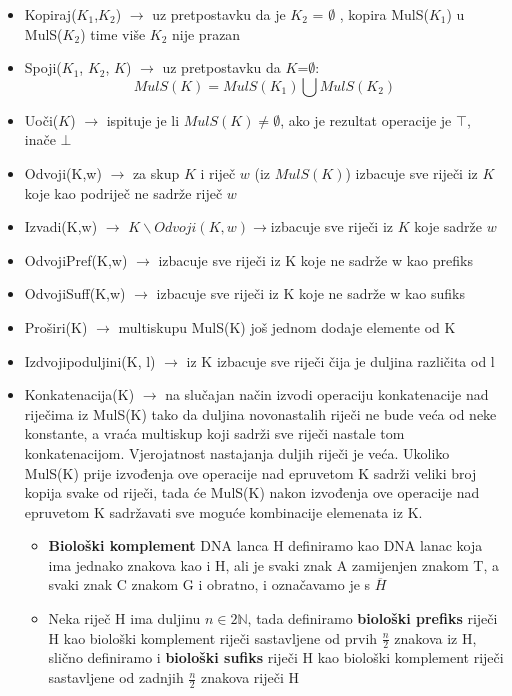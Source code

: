 \documentclass[a4paper,oneside,12pt]{memoir} %
\begin{document}
\begin{spacing}{1.5}
\begin{defn}
    \begin{itemize}
        \item Kopiraj($K_1$,$K_2$) $\to$ uz pretpostavku da je $K_2$ = $\emptyset$ , kopira MulS($K_1$) u MulS($K_2$) time više $K_2$ nije prazan
        \item Spoji($K_1$, $K_2$, $K$) $\to$ uz pretpostavku da $K$=$\emptyset$: \[MulS(K)=MulS(K_1)\bigcup MulS(K_2) \]
        \item Uoči($K$) $\to$ ispituje je li $MulS(K)\neq\emptyset$, ako je rezultat operacije je $\top$, inače $\bot$
        \item Odvoji(K,w) $\to$ za skup $K$ i riječ $w$ (iz $MulS(K)$) izbacuje sve riječi iz $K$ koje kao podriječ ne sadrže riječ $w$
        \item Izvadi(K,w) $\to$ $K\backslash Odvoji(K,w)\to $izbacuje sve riječi iz $K$ koje sadrže $w$
        \item Odvoji\textunderscore Pref(K,w) $\to$ izbacuje sve riječi iz K koje ne sadrže w kao prefiks
        \item Odvoji\textunderscore Suff(K,w) $\to$ izbacuje sve riječi iz K koje ne sadrže w kao sufiks
        \item Proširi(K) $\to$ multiskupu MulS(K) još jednom dodaje elemente od K
        \item Izdvoji\textunderscore po\textunderscore duljini(K, l) $\to$ iz K izbacuje sve riječi čija je duljina različita od l
        \item Konkatenacija(K) $\to$ na slučajan način izvodi operaciju konkatenacije nad riječima iz MulS(K) tako da duljina novonastalih riječi ne bude veća od neke konstante, a vraća multiskup koji sadrži sve riječi nastale tom konkatenacijom. Vjerojatnost nastajanja duljih riječi je veća. Ukoliko MulS(K) prije izvođenja ove operacije nad epruvetom K sadrži veliki broj kopija svake od riječi, tada će MulS(K) nakon izvođenja ove operacije nad epruvetom K sadržavati sve moguće kombinacije elemenata iz K.
            \begin{itemize}
                \item \textbf{Biološki komplement} DNA lanca H definiramo kao DNA lanac koja ima jednako znakova kao i H, ali je svaki znak A zamijenjen znakom T, a svaki znak C znakom G i obratno, i označavamo je s $\overline{H}$
                \item Neka riječ H ima duljinu $n \in 2\mathbb{N}$, tada definiramo \textbf{biološki prefiks} riječi H kao biološki komplement riječi sastavljene od prvih $\frac{n}{2}$ znakova iz H, slično definiramo i \textbf{biološki sufiks} riječi H kao biološki komplement riječi sastavljene od zadnjih $\frac{n}{2}$ znakova riječi H

\end{itemize}
\end{itemize}
\end{defn}
\end{spacing}
\end{document}

